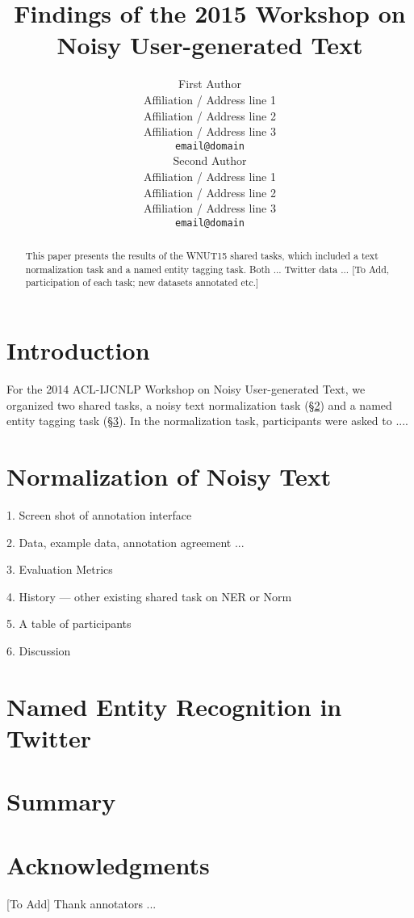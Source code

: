 \documentclass[11pt]{article}
\title{Findings of the 2015 Workshop on Noisy User-generated Text}
\author{First Author \\
  Affiliation / Address line 1 \\
  Affiliation / Address line 2 \\
  Affiliation / Address line 3 \\
  {\tt email@domain} \\\And
  Second Author \\
  Affiliation / Address line 1 \\
  Affiliation / Address line 2 \\
  Affiliation / Address line 3 \\
  {\tt email@domain} \\}
\date{}
\begin{document}
\maketitle
\begin{abstract}
  This paper presents the results of the WNUT15 shared tasks, which included
  a text normalization task and a named entity tagging task. Both ... Twitter data ... [To Add, participation 
  of each task; new datasets annotated etc.]
  
  
\end{abstract}

\section{Introduction}

For the 2014 ACL-IJCNLP Workshop on Noisy User-generated Text, we
organized two shared tasks, a noisy text normalization task (\S\ref{sec:norm}) and a named
entity tagging task (\S\ref{sec:ner}). In the normalization task, participants were asked to ....


\section{Normalization of Noisy Text}\label{sec:norm}

1. Screen shot of annotation interface

2. Data, example data, annotation agreement ... 

3. Evaluation Metrics

4. History --- other existing shared task on NER or Norm

5. A table of participants 

6. Discussion

\section{Named Entity Recognition in Twitter}\label{sec:ner}


\section{Summary}

\section*{Acknowledgments}

[To Add] Thank annotators ... 

%
%
\end{document}
